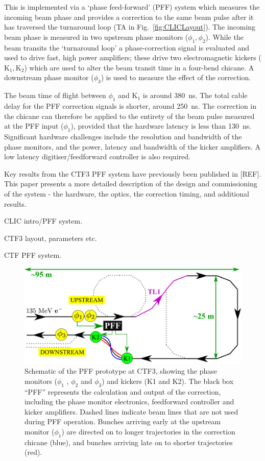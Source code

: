 \documentclass[%
 reprint,
 superscriptaddress,
 amsmath,
 amssymb,
 prstab,
]{revtex4-1}
\begin{document}
This is implemented via a `phase feed-forward' (PFF) system which measures the 
incoming beam phase and provides a correction to the same beam pulse 
after it has traversed the turnaround loop (TA in Fig.~\ref{fig:CLICLayout}). 
The incoming beam phase is measured in two upstream phase 
monitors (\(\phi_{1}, \phi_{2}\)). While the beam 
transits the ‘turnaround loop’ a phase-correction signal is evaluated and used 
to drive fast, high power amplifiers; these drive two electromagnetic kickers 
(\(\mathrm{K_1, K_2}\)) which are used to alter the beam transit time in a 
four-bend chicane. A downstream phase monitor (\(\phi_{3}\)) is 
used to measure the effect of the correction. 

The beam time of flight between \(\phi_1\) and \(\mathrm{K_1}\) is around 
380~ns. The total cable delay for the PFF correction signals 
is shorter, around 250~ns. The correction in the chicane can therefore be 
applied to the entirety of the beam pulse measured at the PFF input 
(\(\phi_1\)), provided that the hardware latency is less than 130~ns. 
Significant hardware challenges include the resolution and bandwidth of the 
phase monitors, and the power, latency and bandwidth of the kicker amplifiers. 
A low latency digitiser/feedforward controller is also required.

Key results from the CTF3 PFF system have previously been published in [REF]. 
This paper presents a more detailed description of the design and commissioning 
of the system - the hardware, the optics, the correction timing, and additional 
results.

CLIC intro/PFF system.

CTF3 layout, parameters etc.

CTF PFF system.

\begin{figure}
	\includegraphics[width=\columnwidth]{figs/intro/ctfpffLayout}%
	\caption{\label{f:pffLayout}Schematic of the PFF prototype at CTF3, 
	showing the phase monitors (\(\phi_1\) , 
	\(\phi_2\) and \(\phi_3\)) and kickers (K1 and K2). The black box “PFF” 
	represents the calculation and output of the correction, including the 
	phase monitor electronics, feedforward controller and kicker amplifiers.
	Dashed lines indicate beam lines that are not used during PFF operation. 
	Bunches arriving early at the upstream monitor (\(\phi_1\)) are directed 
	on to longer trajectories in the correction chicane (blue), and bunches 
	arriving late on to shorter trajectories (red).
		}
\end{figure}
\end{document}
